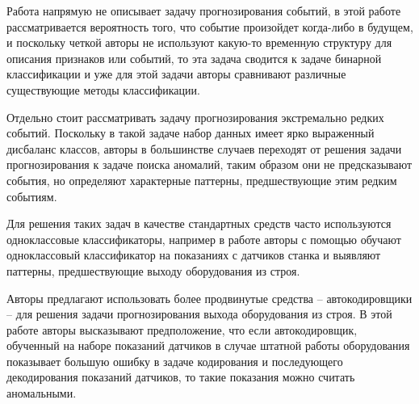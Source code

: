 Работа \cite{comparison_coronary_heart_disease} напрямую не описывает задачу прогнозирования событий, в этой работе рассматривается вероятность того, что событие произойдет когда-либо в будущем, и поскольку четкой авторы не используют какую-то временн\textit{у}ю структуру для описания признаков или событий, то эта задача сводится к задаче бинарной классификации и уже для этой задачи авторы сравнивают различные существующие методы классификации.

Отдельно стоит рассматривать задачу прогнозирования экстремально редких событий. Поскольку в такой задаче набор данных имеет ярко выраженный дисбаланс классов, авторы в большинстве случаев переходят от решения задачи прогнозирования к задаче поиска аномалий, таким образом они не предсказывают события, но определяют характерные паттерны, предшествующие этим редким событиям.

Для решения таких задач в качестве стандартных средств часто используются одноклассовые классификаторы, например в работе \cite{anomaly_detection_oneclass} авторы с помощью обучают одноклассовый классификатор на показаниях с датчиков станка и выявляют паттерны, предшествующие выходу оборудования из строя.

Авторы \cite{anomaly_detection_ae} предлагают использовать более продвинутые средства -- автокодировщики -- для решения задачи прогнозирования выхода оборудования из строя. В этой работе авторы высказывают предположение, что если автокодировщик, обученный на наборе показаний датчиков в случае штатной работы оборудования показывает большую ошибку в задаче кодирования и последующего декодирования показаний датчиков, то такие показания можно считать аномальными.

